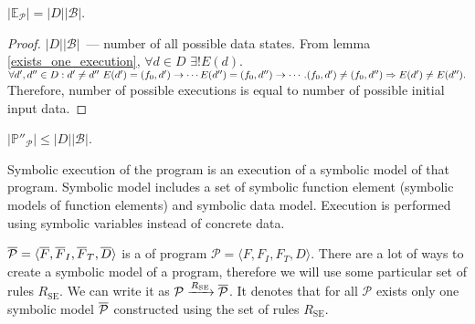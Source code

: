 
\begin{lemma}
    $|\mathds{E}_\mathcal{P}| = |D| |\mathcal{B}|$.
\end{lemma}

\begin{proof}
    $|D| |\mathcal{B}|$~--- number of all possible data states.
    From lemma \ref{exists_one_execution},
        $\forall d \in D \,\, \exists! E(d)$.
    $\forall d', d'' \in D : d' \neq d'' \,\, E(d') = (f_0, d') \rightarrow \cdots
        E(d'') = (f_0, d'') \rightarrow \cdots.
        (f_0, d') \neq (f_0, d'') \Rightarrow E(d') \neq E(d'').$
    Therefore, number of possible executions is equal to number of
    possible initial input data.
\end{proof}

\begin{lemma}
    $|\mathds{P}''_\mathcal{P}| \le |D| |\mathcal{B}|$.
\end{lemma}


Symbolic execution of the program is
an execution of a symbolic model of that program.
Symbolic model includes a set of symbolic function element
(symbolic models of function elements) and
symbolic data model.
Execution is performed using symbolic variables instead of concrete data.


$\overline{\mathcal{P}} = \langle \overline{F}, \overline{F}_I, \overline{F}_T, \overline{D} \rangle$
is a  of program
$\mathcal{P} = \langle F, F_I, F_T, D \rangle$.
There are a lot of ways to create a symbolic model of a program,
therefore we will use some particular set of rules $R_\text{SE}$.
We can write it as
$\mathcal{P} \xrightarrow[]{R_\text{SE}} \overline{\mathcal{P}}$.
It denotes that for all $\mathcal{P}$ exists only one symbolic model
$\overline{\mathcal{P}}$ constructed using the set of rules $R_\text{SE}$.

